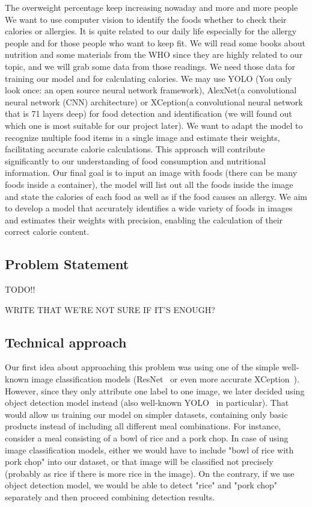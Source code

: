 \documentclass[10pt,twocolumn,letterpaper]{article}
\begin{document}
The overweight percentage keep increasing nowaday and more and more people 
We want to use computer vision to identify the foods whether to check their calories or allergies. It is quite related to our daily life especially for the allergy people and for those people who want to keep fit. 
We will read some books about nutrition and some materials from the WHO since they are highly related to our topic, and we will grab some data from those readings. We need those data for training our model and for calculating calories. We may use YOLO (You only look once: an open source neural network framework), AlexNet(a convolutional neural network (CNN) architecture) or XCeption(a convolutional neural network that is 71 layers deep) for food detection and identification (we will found out which one is most suitable for our project later). We want to adapt the model to recognize multiple food items in a single image and estimate their weights, facilitating accurate calorie calculations. This approach will contribute significantly to our understanding of food consumption and nutritional information. Our final goal is to input an image with foods (there can be many foods inside a container), the model will list out all the foods inside the image and state the calories of each food as well as if the food causes an allergy. We aim to develop a model that accurately identifies a wide variety of foods in images and estimates their weights with precision, enabling the calculation of their correct calorie content.

\subsection{Problem Statement}

TODO!!

WRITE THAT WE'RE NOT SURE IF IT'S ENOUGH?

\subsection{Technical approach}

Our first idea about approaching this problem was using one of the simple well-known image classification models (ResNet~\cite{he2015deepresiduallearningimage} or even more accurate XCeption~\cite{chollet2017xceptiondeeplearningdepthwise}).
However, since they only attribute one label to one image, we later decided using object detection model instead (also well-known YOLO~\cite{redmon2016lookonceunifiedrealtime} in particular).
That would allow us training our model on simpler datasets, containing only basic products instead of including all different meal combinations.
For instance, consider a meal consisting of a bowl of rice and a pork chop.
In case of using image classification models, either we would have to include "bowl of rice with pork chop" into our dataset, or that image will be classified not precisely (probably as rice if there is more rice in the image).
On the contrary, if we use object detection model, we would be able to detect "rice" and "pork chop" separately and then proceed combining detection results.
\end{document}
